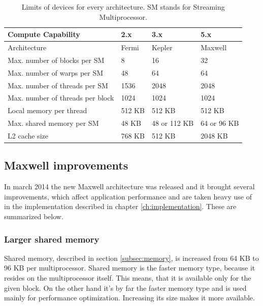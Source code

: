 \begin{table}[ht]
\centering
\begin{tabularx}{\textwidth}{| X | X | X | X |}
\hline
Compute Capability & 2.x & 3.x & 5.x \\
\hline
Architecture & Fermi & Kepler & Maxwell \\
\hline
Max. number of blocks per SM & 8 & 16 & 32 \\
\hline
Max. number of warps per SM & 48 & 64 & 64 \\
\hline
Max. number of threads per SM & 1536 & 2048 & 2048 \\
\hline
Max. number of threads per block & 1024 & 1024 & 1024 \\
\hline
Local memory per thread & 512 KB & 512 KB & 512 KB \\
\hline
Max. shared memory per SM & 48 KB & 48 or 112 KB & 64 or 96 KB \\
\hline
L2 cache size & 768 KB & 512 KB & 2048 KB \\
\hline
\end{tabularx}
\caption{Limits of devices for every architecture. SM stands for Streaming Multiprocessor.}
\label{tab:compute-capability}
\end{table}

\subsection{Maxwell improvements}\label{subsec:cuda-maxwell-imp}

In march 2014 the new Maxwell architecture was released and it brought several improvements, which affect application performance and are taken heavy use of in the implementation described in chapter \ref{ch:implementation}. These are summarized below.

\subsubsection{Larger shared memory}

Shared memory, described in section \ref{subsec:memory}, is increased from 64 KB to 96 KB per multiprocessor. Shared memory is the faster memory type, because it resides on the multiprocessor itself. This means, that it is available only for the given block. On the other hand it's by far the faster memory type and is used mainly for performance optimization. Increasing its size makes it more available.

\FloatBarrier

